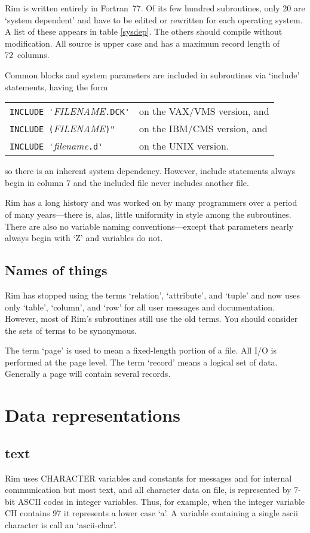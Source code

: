 \documentclass[11pt,a4paper]{report}
\begin{document}
Rim is written entirely in Fortran~77.  Of its few
hundred subroutines, only 20 are `system dependent'
and have to be edited or rewritten for each operating system.
A list of these appears in table \ref{sysdep}.
The others should compile without modification.
All source is upper case and has a maximum record length of
72~columns.
 
Common blocks and system parameters are included in subroutines
via `include' statements, having the form

\begin{tabular}{ll}
  \verb|INCLUDE '|\emph{FILENAME}\verb|.DCK'| & on the VAX/VMS version, and\\
  \verb|INCLUDE (|\emph{FILENAME}\verb|)"| & on the IBM/CMS version, and\\
  \verb|INCLUDE '|\emph{filename}\verb|.d'| & on the UNIX version.
\end{tabular}

so there is an inherent system dependency.  However, include
statements always begin in column 7 and the included file
never includes another file.
 
Rim has a long history and was worked on by many programmers
over a period of many years---there is, alas, little
uniformity in style among the subroutines.  There are also
no variable naming conventions---except that parameters
nearly always begin with `Z' and variables do not.
 
\subsection{Names of things}
%
Rim has stopped using the terms `relation', `attribute', and `tuple'
and now uses only `table', `column', and `row' for all user
messages and documentation.  However, most of Rim's subroutines
still use the old terms.  You should consider the sets of
terms to be synonymous.
 
The term `page' is used to mean a fixed-length portion of a file.
All I/O is performed at the page level.  The term `record' means
a logical set of data.  Generally a page will contain several
records.
 
 
\section{Data representations}
%
\subsection{text}
%
Rim uses CHARACTER variables and constants for messages and
for internal communication but most text, and all
character data on file, is represented by 7-bit ASCII codes
in integer variables.  Thus, for example, when the integer
variable CH contains 97 it represents a lower case `a'.
A variable containing a single ascii character is
call an `ascii-char'.
 
\end{document}
